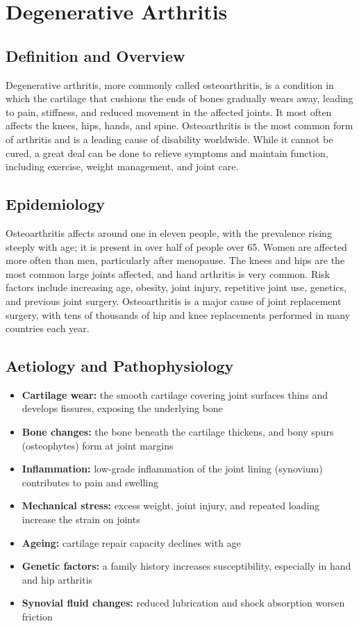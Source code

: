\chapter{Degenerative Arthritis}

\section*{Definition and Overview}
Degenerative arthritis, more commonly called osteoarthritis, is a condition in which the cartilage that cushions the ends of bones gradually wears away, leading to pain, stiffness, and reduced movement in the affected joints. It most often affects the knees, hips, hands, and spine. Osteoarthritis is the most common form of arthritis and is a leading cause of disability worldwide. While it cannot be cured, a great deal can be done to relieve symptoms and maintain function, including exercise, weight management, and joint care.

\section*{Epidemiology}
Osteoarthritis affects around one in eleven people, with the prevalence rising steeply with age; it is present in over half of people over 65. Women are affected more often than men, particularly after menopause. The knees and hips are the most common large joints affected, and hand arthritis is very common. Risk factors include increasing age, obesity, joint injury, repetitive joint use, genetics, and previous joint surgery. Osteoarthritis is a major cause of joint replacement surgery, with tens of thousands of hip and knee replacements performed in many countries each year.

\section*{Aetiology and Pathophysiology}
\begin{itemize}
    \item \textbf{Cartilage wear:} the smooth cartilage covering joint surfaces thins and develops fissures, exposing the underlying bone
    \item \textbf{Bone changes:} the bone beneath the cartilage thickens, and bony spurs (osteophytes) form at joint margins
    \item \textbf{Inflammation:} low-grade inflammation of the joint lining (synovium) contributes to pain and swelling
    \item \textbf{Mechanical stress:} excess weight, joint injury, and repeated loading increase the strain on joints
    \item \textbf{Ageing:} cartilage repair capacity declines with age
    \item \textbf{Genetic factors:} a family history increases susceptibility, especially in hand and hip arthritis
    \item \textbf{Synovial fluid changes:} reduced lubrication and shock absorption worsen friction
\end{itemize}

